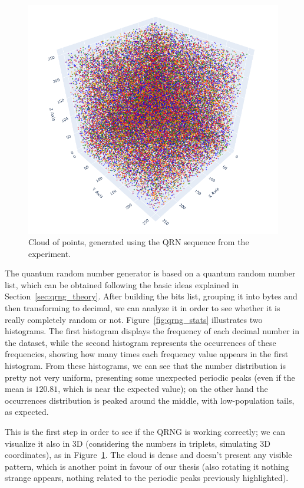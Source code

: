 \documentclass[prl,twocolumn]{revtex4-1}
\begin{document}
\begin{figure}[!b]
    \centering
    \includegraphics[width=\linewidth]{Images/QRNG.png}
    \caption{Cloud of points, generated using the QRN sequence from the experiment.}
    \label{fig:QRNG}
\end{figure}

The quantum random number generator is based on a quantum random number list, which can be obtained following the basic ideas explained in Section~\ref{sec:qrng_theory}. After building the bits list, grouping it into bytes and then transforming to decimal, we can analyze it in order to see whether it is really completely random or not. Figure~\ref{fig:qrng_stats} illustrates two histograms. The first histogram displays the frequency of each decimal number in the dataset, while the second histogram represents the occurrences of these frequencies, showing how many times each frequency value appears in the first histogram. From these histograms, we can see that the number distribution is pretty not very uniform, presenting some unexpected periodic peaks (even if the mean is $120.81$, which is near the expected value); on the other hand the occurrences distribution is peaked around the middle, with low-population tails, as expected. 

This is the first step in order to see if the QRNG is working correctly; we can visualize it also in 3D (considering the numbers in triplets, simulating 3D coordinates), as in Figure~\ref{fig:QRNG}. The cloud is dense and doesn't present any visible pattern, which is another point in favour of our thesis (also rotating it nothing strange appears, nothing related to the periodic peaks previously highlighted). 
\end{document}
